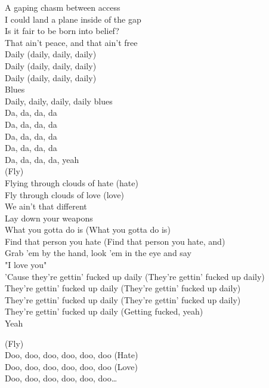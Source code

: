 A gaping chasm between access\\
I could land a plane inside of the gap\\
Is it fair to be born into belief?\\
That ain't peace, and that ain't free\\
Daily (daily, daily, daily)\\
Daily (daily, daily, daily)\\
Daily (daily, daily, daily)\\
Blues\\
Daily, daily, daily, daily blues\\

Da, da, da, da\\
Da, da, da, da\\
Da, da, da, da\\
Da, da, da, da\\
Da, da, da, da, yeah\\

(Fly)\\
Flying through clouds of hate (hate)\\
Fly through clouds of love (love)\\
We ain't that different\\
Lay down your weapons\\
What you gotta do is (What you gotta do is)\\
Find that person you hate (Find that person you hate, and)\\
Grab 'em by the hand, look 'em in the eye and say\\
"I love you"\\

'Cause they're gettin' fucked up daily (They're gettin' fucked up daily)\\
They're gettin' fucked up daily (They're gettin' fucked up daily)\\
They're gettin' fucked up daily (They're gettin' fucked up daily)\\
They're gettin' fucked up daily (Getting fucked, yeah)\\
Yeah

(Fly)\\
Doo, doo, doo, doo, doo, doo (Hate)\\
Doo, doo, doo, doo, doo, doo (Love)\\
Doo, doo, doo, doo, doo, doo…\\

